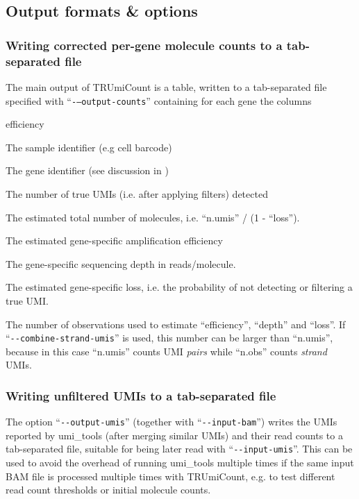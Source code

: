 \documentclass{scrartcl}
\makeatletter
\let\subsection@phlo\subsection
\renewcommand\subsection{\needspace{5\baselineskip}\subsection@phlo}
\newcommand{\ddarg}[1]{\texttt{-{}-#1}}
\DeclareRobustCommand*{\nameref}[1]{%
      \textit{\my@nameref{#1}}%
    }%
\makeatother
\begin{document}
\subsection{Output formats \& options}\label{output-options}

\subsubsection*{Writing corrected per-gene molecule counts to a tab-separated file}

\begin{sloppypar}
The main output of TRUmiCount is a table, written to a tab-separated file specified with ``\ddarg{--output-counts}'' containing for each gene the columns
\begin{labeling}[:]{efficiency}
\item[sample] The sample identifier (e.g cell barcode)
\item[gene] The gene identifier (see discussion in \nameref{input-bam})
\item[n.umis] The number of true UMIs (i.e. after applying filters) detected
\item[n.tot] The estimated total number of molecules, i.e. ``n.umis'' / (1 - ``loss'').
\item[efficiency] The estimated gene-specific amplification efficiency
\item[depth] The gene-specific sequencing depth in reads/molecule.
\item[loss] The estimated gene-specific loss, i.e. the probability of not detecting or filtering a true UMI. 
\item[n.obs] The number of observations used to estimate ``efficiency'', ``depth'' and ``loss''. If ``\ddarg{combine-strand-umis}'' is used, this number can be larger than ``n.umis'', because in this case ``n.umis'' counts UMI \emph{pairs} while ``n.obs'' counts \emph{strand} UMIs.
\end{labeling}
\end{sloppypar}

\subsubsection*{Writing unfiltered UMIs to a tab-separated file }

The option ``\ddarg{output-umis}'' (together with ``\ddarg{input-bam}'') writes the UMIs reported by umi\_tools (after merging similar UMIs) and their read counts to a tab-separated file, suitable for being later read with ``\ddarg{input-umis}''. This can be used to avoid the overhead of running umi\_tools multiple times if the same input BAM file is processed multiple times with TRUmiCount, e.g. to test different read count thresholds or initial molecule counts.
\end{document}
